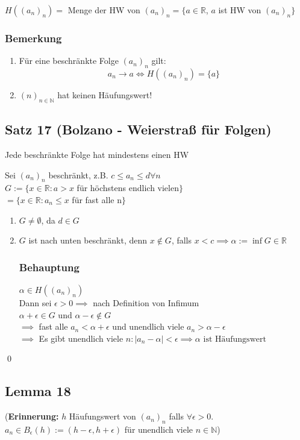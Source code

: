 \documentclass[fleqn]{scrbook}
\newcommand{\R}{\mathbb{R}}
\newcommand{\N}{\mathbb{N}}
\renewenvironment{proof}{{\bfseries Beweis }}{\qed}
\begin{document}
$H((a_n)_n) = $ Menge der HW von $(a_n)_n = \{ a\in\R$, $a$ ist HW von $(a_n)_n\}$
\subsubsection{Bemerkung}
\begin{enumerate}[1)]
\item Für eine beschränkte Folge $(a_n)_n$ gilt: $$a_n \rightarrow a \Leftrightarrow H((a_n)_n) = \{a\}$$
\item $(n)_{n\in\N}$ hat keinen Häufungswert!
\end{enumerate}
\subsection{Satz 17 (Bolzano - Weierstraß für Folgen)} Jede beschränkte Folge hat mindestens einen HW

\begin{proof}
Sei $(a_n)_n$ beschränkt, z.B. $c \leq a_n \leq d \forall n$\\
$G := \{ x\in\R: a > x$ für höchstens endlich vielen$\}$\\
$=\{x\in\R: a_n \leq x$ für fast alle n$\}$
\begin{enumerate}
\item $G \neq \emptyset$, da $d \in G$
\item $G$ ist nach unten beschränkt, denn $x \notin G$, falls $x < c \implies \alpha := \inf G \in \R$

\subsubsection{Behauptung} $\alpha \in H((a_n)_n)$\\
Dann sei $\epsilon > 0 \implies$ nach Definition von Infimum \\
$\alpha + \epsilon \in G$ und $\alpha - \epsilon \notin G$ \\
$\implies$ fast alle $a_n < \alpha + \epsilon$ und unendlich viele $a_n > \alpha - \epsilon$\\
$\implies$ Es gibt unendlich viele $n: |a_n - \alpha| < \epsilon \implies \alpha \text{ ist Häufungswert}$
\end{enumerate}
\end{proof}

\subsection{Lemma 18} 
(\textbf{Erinnerung:} $h$ Häufungswert von $(a_n)_n$ falls $\forall \epsilon > 0 $. $a_n \in B_\epsilon (h):= (h-\epsilon, h+\epsilon)$ für unendlich viele $n \in \N$)
\end{document}
